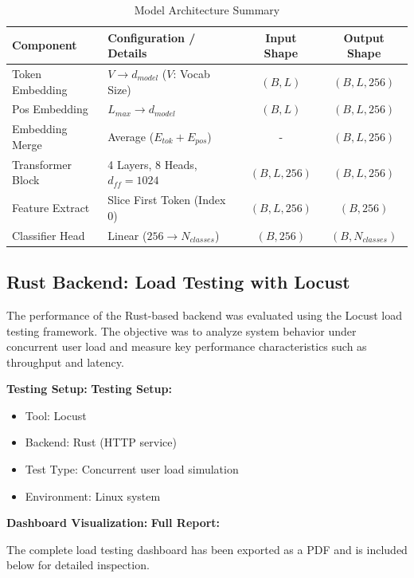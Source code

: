\documentclass[10pt,a4paper,twocolumn]{article}
\begin{document}
\begin{table}[t!]
\centering
\caption{Model Architecture Summary}
\label{tab:model_arch}
\begin{tabular}{|l|l|c|c|}
\hline
\textbf{Component} & \textbf{Configuration / Details} & \textbf{Input Shape} & \textbf{Output Shape} \\ \hline
Token Embedding & $V \to d_{model}$ ($V$: Vocab Size) & $(B, L)$ & $(B, L, 256)$ \\ \hline
Pos Embedding & $L_{max} \to d_{model}$ & $(B, L)$ & $(B, L, 256)$ \\ \hline
Embedding Merge & Average ($E_{tok} + E_{pos}$) & - & $(B, L, 256)$ \\ \hline
Transformer Block & 4 Layers, 8 Heads, $d_{ff}=1024$ & $(B, L, 256)$ & $(B, L, 256)$ \\ \hline
Feature Extract & Slice First Token (Index 0) & $(B, L, 256)$ & $(B, 256)$ \\ \hline
Classifier Head & Linear ($256 \to N_{classes}$) & $(B, 256)$ & $(B, N_{classes})$ \\ \hline
\end{tabular}
\end{table}



\subsection{Rust Backend: Load Testing with Locust}

The performance of the Rust-based backend was evaluated using the Locust load testing framework. The objective was to analyze system behavior under concurrent user load and measure key performance characteristics such as throughput and latency.

\textbf{Testing Setup:}
\textbf{Testing Setup:}
\begin{itemize}
    \item Tool: Locust
    \item Backend: Rust (HTTP service)
    \item Test Type: Concurrent user load simulation
    \item Environment: Linux system
\end{itemize}

\textbf{Dashboard Visualization:}
\textbf{Full Report:}

The complete load testing dashboard has been exported as a PDF and is included below for detailed inspection.
\end{document}
